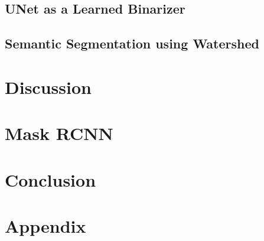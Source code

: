 \documentclass[paper=letter, fontsize=12pt]{article}
\newcommand\includeappendices{%
  \appendix
  \renewcommand{\thesection}{\Alph{section}}
  \section{Appendix}
  \the\mainnotetoks}
\numberwithin{equation}{section} %
\numberwithin{figure}{section} %
\numberwithin{table}{section} %
\begin{document}
\subsection{UNet as a Learned Binarizer}

\subsection{Semantic Segmentation using Watershed}

\section{Discussion}

\section{Mask RCNN}



\section{Conclusion}

\newpage

\printbibliography

\newpage

\includeappendices
\end{document}
